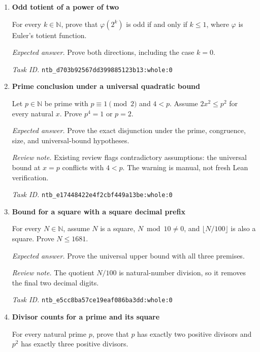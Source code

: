 \documentclass[11pt]{article}
\newcommand{\pth}[1]{\nolinkurl{#1}}
\begin{document}
\begin{enumerate}[label={TEST \arabic*.},leftmargin=4.5em,itemsep=1em]
\emph{Expected answer.} Prove the natural-number upper bound while retaining the stated nonzero parameter $n$.

\emph{Review note.} The parameter $n$ and its hypothesis do not occur in the target expression.

\emph{Task ID.} \pth{ntb_cb9923d415db6eaf0b10d6bd:whole:0}

\item \textbf{Odd totient of a power of two}\label{qn:test:72}

For every $k\in\mathbb N$, prove that $\varphi(2^k)$ is odd if and only if $k\le1$, where $\varphi$ is Euler's totient function.

\emph{Expected answer.} Prove both directions, including the case $k=0$.

\emph{Task ID.} \pth{ntb_d703b92567dd399885123b13:whole:0}

\item \textbf{Prime conclusion under a universal quadratic bound}\label{qn:test:73}

Let $p\in\mathbb N$ be prime with $p\equiv1\pmod2$ and $4<p$. Assume $2x^2\le p^2$ for every natural $x$. Prove $p^4=1$ or $p=2$.

\emph{Expected answer.} Prove the exact disjunction under the prime, congruence, size, and universal-bound hypotheses.

\emph{Review note.} Existing review flags contradictory assumptions: the universal bound at $x=p$ conflicts with $4<p$. The warning is manual, not fresh Lean verification.

\emph{Task ID.} \pth{ntb_e17448422e4f2cbf449a13be:whole:0}

\item \textbf{Bound for a square with a square decimal prefix}\label{qn:test:74}

For every $N\in\mathbb N$, assume $N$ is a square, $N\bmod10\ne0$, and $\lfloor N/100\rfloor$ is also a square. Prove $N\le1681$.

\emph{Expected answer.} Prove the universal upper bound with all three premises.

\emph{Review note.} The quotient $N/100$ is natural-number division, so it removes the final two decimal digits.

\emph{Task ID.} \pth{ntb_e5cc8ba57ce19eaf086ba3dd:whole:0}

\item \textbf{Divisor counts for a prime and its square}\label{qn:test:75}

For every natural prime $p$, prove that $p$ has exactly two positive divisors and $p^2$ has exactly three positive divisors.


\end{enumerate}
\end{document}
